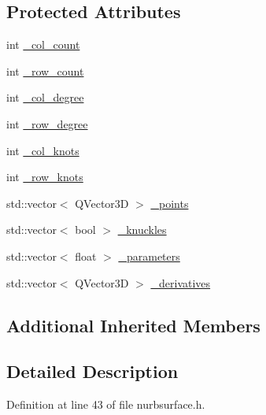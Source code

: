 \subsection*{Protected Attributes}
\begin{DoxyCompactItemize}
\item 
int \hyperlink{classShipCADGeometry_1_1NURBSurface_a31e27f8c4fcc7e0073fdc6d117cb3cb1}{\-\_\-col\-\_\-count}
\item 
int \hyperlink{classShipCADGeometry_1_1NURBSurface_a88c1ca0b8176d2c0a758afa936d8eaba}{\-\_\-row\-\_\-count}
\item 
int \hyperlink{classShipCADGeometry_1_1NURBSurface_a24f91b5212f2705c28bda35282ec5cb9}{\-\_\-col\-\_\-degree}
\item 
int \hyperlink{classShipCADGeometry_1_1NURBSurface_a8de52ae5ee0129c669721597b0e98adf}{\-\_\-row\-\_\-degree}
\item 
int \hyperlink{classShipCADGeometry_1_1NURBSurface_a9364be529dc16146063112608dfdd3a4}{\-\_\-col\-\_\-knots}
\item 
int \hyperlink{classShipCADGeometry_1_1NURBSurface_a79ed680d5cafd6d893e099e9e93bead2}{\-\_\-row\-\_\-knots}
\item 
std\-::vector$<$ Q\-Vector3\-D $>$ \hyperlink{classShipCADGeometry_1_1NURBSurface_ae040c228e863bedf30c7e70a94a87c27}{\-\_\-points}
\item 
std\-::vector$<$ bool $>$ \hyperlink{classShipCADGeometry_1_1NURBSurface_a9d6d1bc4ffd84dcab014313963705389}{\-\_\-knuckles}
\item 
std\-::vector$<$ float $>$ \hyperlink{classShipCADGeometry_1_1NURBSurface_a61d19bf03c2aef8db727a199308da45a}{\-\_\-parameters}
\item 
std\-::vector$<$ Q\-Vector3\-D $>$ \hyperlink{classShipCADGeometry_1_1NURBSurface_afcc62885b941c474e1217d1b9a8143b1}{\-\_\-derivatives}
\end{DoxyCompactItemize}
\subsection*{Additional Inherited Members}


\subsection{Detailed Description}


Definition at line 43 of file nurbsurface.\-h.



